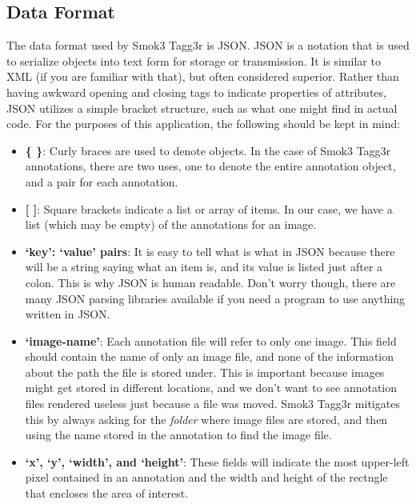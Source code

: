 \documentclass{article}
\begin{document}
\subsection{Data Format}
The data format used by Smok3 Tagg3r is JSON. JSON is a notation that is used to serialize objects into text form for storage or transmission. It is similar to XML (if you are familiar with that), but often considered superior. Rather than having awkward opening and closing tags to indicate properties of attributes, JSON utilizes a simple bracket structure, such as what one might find in actual code. For the purposes of this application, the following should be kept in mind:
\begin{itemize}
  \item \textbf{\{ \}}: Curly braces are used to denote objects. In the case of Smok3 Tagg3r annotations, there are two uses, one to denote the entire annotation object, and a pair for each annotation.

  \item \textbf{{[} {]}}: Square brackets indicate a list or array of items. In our case, we have a list (which may be empty) of the annotations for an image.

  \item \textbf{`key': `value' pairs}: It is easy to tell what is what in JSON because there will be a string saying what an item is, and its value is listed just after a colon. This is why JSON is human readable. Don't worry though, there are many JSON parsing libraries available if you need a program to use anything written in JSON.

  \item \textbf{`image-name'}: Each annotation file will refer to only one image. This field should contain the name of only an image file, and none of the information about the path the file is stored under. This is important because images might get stored in different locations, and we don't want to see annotation files rendered useless just because a file was moved. Smok3 Tagg3r mitigates this by always asking for the \emph{folder} where image files are stored, and then using the name stored in the annotation to find the image file.

  \item \textbf{`x', `y', `width', and `height'}: These fields will indicate the most upper-left pixel contained in an annotation and the width and height of the rectngle that encloses the area of interest. 
\end{itemize}
\end{document}
